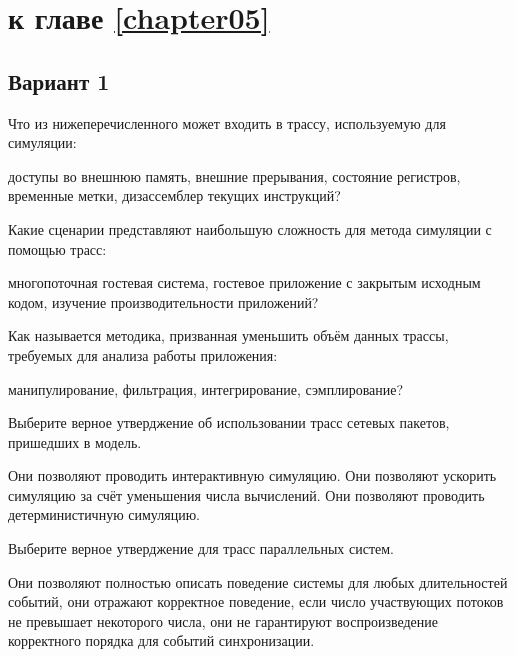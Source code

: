 \section{\Questions к главе \ref{chapter05}} %

\subsection*{Вариант 1}

\begin{questions}

\question[3] Что из нижеперечисленного может входить в трассу, используемую для симуляции:
\begin{choices}
    \correctchoice доступы во внешнюю память,
    \correctchoice внешние прерывания,
    \choice состояние регистров,
    \correctchoice временные метки,
    \choice дизассемблер текущих инструкций?
\end{choices}

\question[3] Какие сценарии представляют наибольшую сложность для метода симуляции с помощью трасс:
\begin{choices}
\correctchoice многопоточная гостевая система,
\choice гостевое приложение с закрытым исходным кодом,
\choice изучение производительности приложений?
\end{choices}

\question[3] Как называется методика, призванная уменьшить объём данных трассы, требуемых для анализа работы приложения:
\begin{choices}
\choice манипулирование,
\choice фильтрация,
\choice интегрирование,
\correctchoice сэмплирование?
\end{choices}

\question[3] Выберите верное утверджение об использовании трасс сетевых пакетов, пришедших в модель.
\begin{choices}
\choice Они позволяют проводить интерактивную симуляцию.
\choice Они позволяют ускорить симуляцию за счёт уменьшения числа вычислений.
\correctchoice Они позволяют проводить детерминистичную симуляцию.
\end{choices}

\question[3] Выберите верное утверджение для трасс параллельных систем.
\begin{choices}
\choice Они позволяют полностью описать поведение системы для любых длительностей событий,
\choice они отражают корректное поведение, если число участвующих потоков не превышает некоторого числа,
\correctchoice они не гарантируют воспроизведение корректного порядка для событий синхронизации.
\end{choices}


\end{questions}

